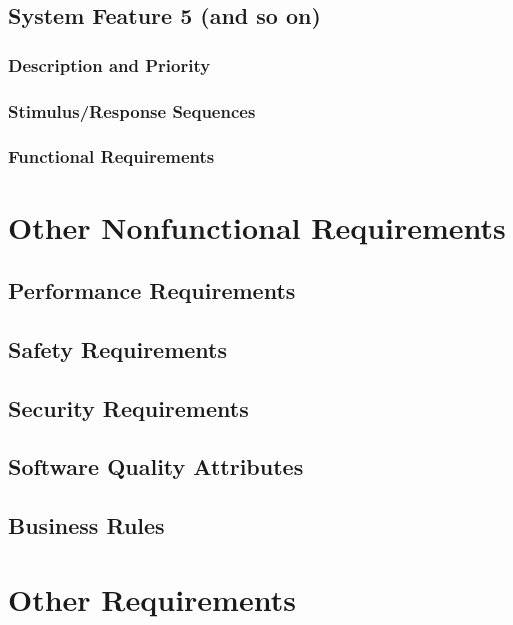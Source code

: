 \documentclass{scrreprt}
\begin{document}
\section{System Feature 5 (and so on)}

\subsection{Description and Priority}



\subsection{Stimulus/Response Sequences}


\subsection{Functional Requirements}


\chapter{Other Nonfunctional Requirements}

\section{Performance Requirements}


\section{Safety Requirements}


\section{Security Requirements}


\section{Software Quality Attributes}


\section{Business Rules}



\chapter{Other Requirements}
\end{document}
